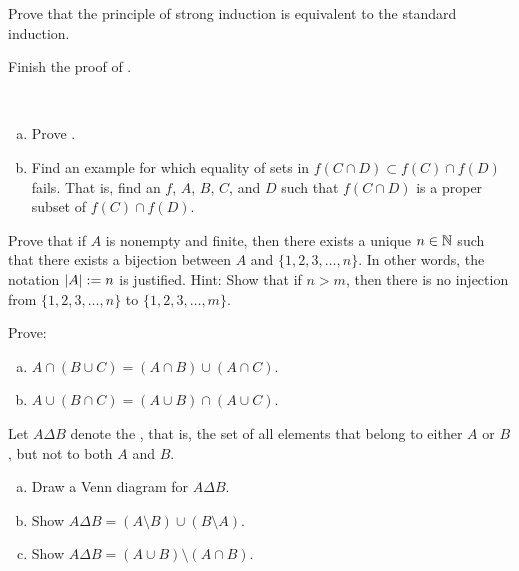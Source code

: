 \begin{exercise}
Prove that the principle of strong induction is equivalent to the standard
induction.
\end{exercise}

\begin{exercise}
Finish the proof of .
\end{exercise}

\begin{exercise}
{\ }
\begin{enumerate}[a)]
\item
Prove .
\item
Find an example for which equality of sets
in 
$f( C \cap D) \subset f (C) \cap f (D)$
fails.  That is, find an $f$, $A$, $B$, $C$, and $D$ such that
$f( C \cap D)$ is a proper subset of $f(C) \cap f(D)$.
\end{enumerate}
\end{exercise}

\begin{exercise}[Tricky]
Prove that if $A$ is nonempty and finite, then there exists a unique
$n \in {\mathbb{N}}$ such
that there exists a bijection between $A$ and $\{ 1, 2, 3, \ldots, n \}$.
In other words, the notation $\left\lvert {A} \right\rvert := n$ is justified.
Hint: Show that if $n > m$, then there is no injection from
$\{ 1, 2, 3, \ldots, n \}$ to
$\{ 1, 2, 3, \ldots, m \}$.
\end{exercise}


\begin{exercise}
Prove:
\begin{enumerate}[a)]
\item $A \cap (B \cup C) = (A \cap B) \cup (A \cap C)$.
\item $A \cup (B \cap C) = (A \cup B) \cap (A \cup C)$.
\end{enumerate}
\end{exercise}

\begin{samepage}
\begin{exercise}
Let $A \Delta B$ denote the
\emph{}, that is, the set of all elements that
belong to either $A$ or $B$, but not to both $A$ and $B$.
\begin{enumerate}[a)]
\item
Draw a Venn diagram for
$A \Delta B$.
\item
Show $A \Delta B = (A \setminus B) \cup (B \setminus A)$.
\item
Show $A \Delta B = (A \cup B) \setminus ( A \cap B)$.
\end{enumerate}
\end{exercise}
\end{samepage}

